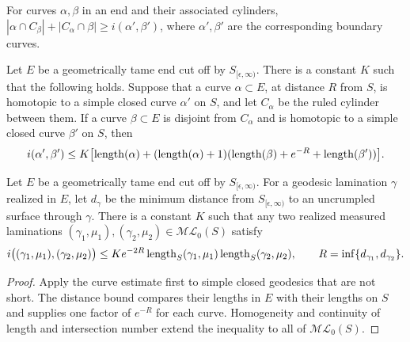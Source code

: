 \begin{proposition}
\label{thurston-ch09-end-intersection-estimate}
 For curves $\alpha,\beta$ in an end and their associated cylinders, $|\alpha\cap C_\beta|+|C_\alpha\cap\beta|\ge i(\alpha',\beta')$, where $\alpha',\beta'$ are the corresponding boundary curves.
\end{proposition}

\begin{proposition}
\label{thurston-ch09-short-curve-bound}
 Let $E$ be a geometrically tame end cut off by $S_{[\epsilon,\infty)}$.
There is a constant $K$ such that the following holds.  Suppose that a curve
$\alpha\subset E$, at distance $R$ from $S$, is homotopic to a simple closed
curve $\alpha'$ on $S$, and let $C_\alpha$ be the ruled cylinder between them.
If a curve $\beta\subset E$ is disjoint from $C_\alpha$ and is homotopic to a
simple closed curve $\beta'$ on $S$, then
\[
 i(\alpha',\beta')\leq
 K\bigl[\operatorname{length}(\alpha)+(\operatorname{length}(\alpha)+1)
   (\operatorname{length}(\beta)+e^{-R}+\operatorname{length}(\beta'))\bigr].
\]
\end{proposition}

\begin{theorem}
\label{thurston-ch09-measured-ending-estimate}
 Let $E$ be a geometrically tame end cut off by $S_{[\epsilon,\infty)}$.
For a geodesic lamination $\gamma$ realized in $E$, let $d_\gamma$ be the
minimum distance from $S_{[\epsilon,\infty)}$ to an uncrumpled surface through
$\gamma$.  There is a constant $K$ such that any two realized measured
laminations $(\gamma_1,\mu_1),(\gamma_2,\mu_2)\in\mathcal{ML}_0(S)$ satisfy
\[
 i\bigl((\gamma_1,\mu_1),(\gamma_2,\mu_2)\bigr)
 \leq K e^{-2R}\operatorname{length}_S(\gamma_1,\mu_1)\operatorname{length}_S(\gamma_2,\mu_2),
 \qquad R=\inf\{d_{\gamma_1},d_{\gamma_2}\}.
\]
\end{theorem}
\begin{proof}\sketch Apply the curve estimate first to simple closed geodesics that are not short.  The distance bound compares their lengths in $E$ with their lengths on $S$ and supplies one factor of $e^{-R}$ for each curve.  Homogeneity and continuity of length and intersection number extend the inequality to all of $\mathcal{ML}_0(S)$.\end{proof}

